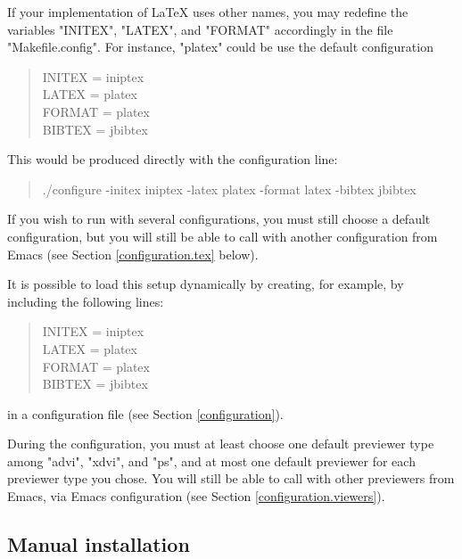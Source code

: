 \documentclass[12pt]{article}
\begin{document}
If your implementation of {\LaTeX} uses other names, you may redefine the
variables \lst"INITEX", \lst"LATEX", and \lst"FORMAT" accordingly in the
file \lst"Makefile.config".
%
For instance, \lst"platex" could be use the default configuration
\begin{quote}
\begin{tt}
INITEX = iniptex\\
LATEX = platex\\
FORMAT = platex\\
BIBTEX = jbibtex
\end{tt}
\end{quote}
This would be produced directly with the configuration line:
\begin{quote}
\begin{tt}
./configure -initex iniptex -latex platex -format latex -bibtex jbibtex
\end{tt}
\end{quote}
If you wish to run {\whizzy} with several configurations, you must still
choose a default configuration, but you will still be able to call {\whizzy}
with another configuration from Emacs (see Section \ref{configuration.tex}
below).

It is possible to load this setup dynamically by creating, for example, 
by including the following lines: 
\begin{quote}
\begin{tt}
INITEX = iniptex\\
LATEX = platex\\
FORMAT = platex\\
BIBTEX = jbibtex
\end{tt}
\end{quote}
in a configuration file (see Section \ref {configuration}).

During the configuration, you must at least choose one default previewer
type among \lst"advi", \lst"xdvi", and \lst"ps", and at most one default
previewer for each previewer type you chose. You will still be able to call
{\whizzy} with other previewers from Emacs, via Emacs configuration (see
Section
\ref {configuration.viewers}). 

\subsection {Manual installation}
\end{document}

